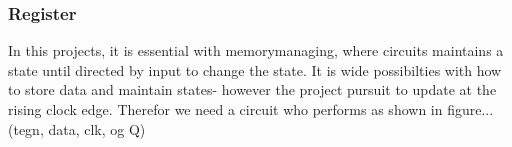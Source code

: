\subsubsection{Register} \label{Register}
In this projects, it is essential with memorymanaging, where circuits maintains a state until directed by input to change the state. It is wide possibilties with how to store data and maintain states- however the project pursuit to update at the rising clock edge. Therefor we need a circuit who performs as shown in figure... (tegn, data, clk, og Q)